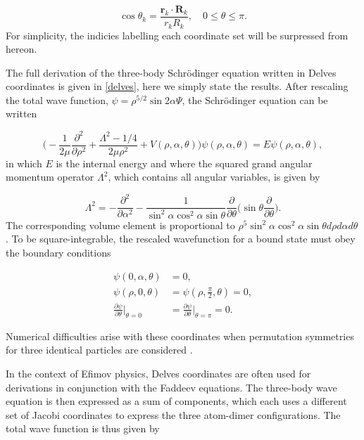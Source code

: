 \begin{equation}
\cos{\theta_{k}} = \frac{\mathbf{r}_{k} \cdot \mathbf{R}_{k}}{r_{k} R_{k}}, \quad  0\leq \theta \leq \pi.
\end{equation}
For simplicity, the indicies labelling each coordinate set will be surpressed from hereon. 

The full derivation of the three-body Schr{\"o}dinger equation written in Delves coordinates is given in \cref{delves}, here we simply state the results. After rescaling the total wave function, $\psi = \rho^{5/2}\sin2\alpha\Psi$, the Schr{\"o}dinger equation can be written

\begin{equation}
\bigg(-\frac{1}{2\mu}\frac{\partial^2}{\partial\rho^2} + \frac{\Lambda^2 - 1/4}{2\mu\rho^2} + V(\rho,\alpha,\theta)\bigg) \psi(\rho,\alpha,\theta) = E \psi(\rho,\alpha,\theta),
\end{equation}
in which $E$ is the internal energy and where the squared grand angular momentum operator $\Lambda^2$, which contains all angular variables, is given by

\begin{equation}
\Lambda^2 = -\frac{\partial^2}{\partial\alpha^2} - \frac{1}{\sin^2\alpha\cos^2\alpha\sin\theta} \frac{\partial}{\partial\theta} \bigg( \sin\theta \frac{\partial}{\partial\theta}\bigg).
\end{equation}
The corresponding volume element is proportional to $\rho^5\sin^2\alpha\cos^2\alpha\sin\theta d\rho d\alpha d\theta$. To be square-integrable, the rescaled wavefunction for a bound state must obey the boundary conditions

\begin{align}
\psi(0,\alpha,\theta) &= 0,\\
\psi(\rho,0,\theta)    &= \psi(\rho,\frac{\pi}{2},\theta) = 0,\\
\frac{\partial\psi}{\partial\theta}\bigg\rvert_{\theta = 0} &= \frac{\partial\psi}{\partial\theta}\bigg\rvert_{\theta = \pi} = 0.
\end{align} 

Numerical difficulties arise with these coordinates when permutation symmetries for three identical particles are considered \cite{rimondo_berman_lin}. 

In the context of Efimov physics, Delves coordinates are often used for derivations in conjunction with the Faddeev equations. The three-body wave equation is then expressed as a sum of components, which each uses a different set of Jacobi coordinates to express the three atom-dimer configurations.  The total wave function is thus given by

